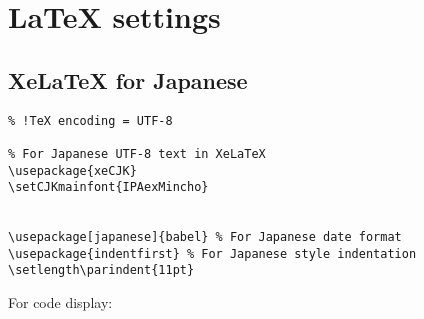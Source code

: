 \chapter{LaTeX settings}\label{gen_discussion}

\section{XeLaTeX for Japanese}\label{discussion}

\begin{lstlisting}[language={[latex]TeX}, title={small Language: XeLaTeX}]
% !TeX program = XeLaTeX
% !TeX encoding = UTF-8

% For Japanese UTF-8 text in XeLaTeX
\usepackage{xeCJK}
\setCJKmainfont{IPAexMincho}


\usepackage[japanese]{babel} % For Japanese date format
\usepackage{indentfirst} % For Japanese style indentation
\setlength\parindent{11pt}
\end{lstlisting}


For code display:

